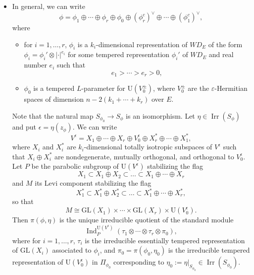 \documentclass[11pt]{amsart}
\numberwithin{equation}{section}
\theoremstyle{plain}
\theoremstyle{definition}
\theoremstyle{remark}
\def\Ind{\operatorname{Ind}}
\def\Irr{\operatorname{Irr}}
\def\GL{\mathrm{GL}}
\def\U{\mathrm{U}}
\def\WD{\mathit{WD}}
\begin{document}
\begin{itemize}
Then the restriction of $R(w, \tau \otimes \pi_0)$ to $\pi(\phi, \eta)$ is the scalar multiplication by 
\begin{equation}
\label{eq:lir}
 \begin{cases}
 \epsilon^k \cdot \eta(a_1) & \text{if $\phi_1$ has sign $(-1)^{n-1}$;} \\
 \epsilon^k & \text{if $\phi_1$ has sign $(-1)^n$.}
 \end{cases}
\end{equation}
These properties follow from the definition of $\eta$, induction in stages \cite[\S 2.7]{kmsw}, and the local intertwining relation \cite[Theorem 3.4.3]{mok}, \cite[Theorem 2.6.2]{kmsw}.
We also remark that the factor $\epsilon^k$ arises from the splitting $s' : W_\psi(M,G) \rightarrow \pi_0(N_\psi(M,G))$ defined in \cite[\S 2.4.1]{kmsw}, which can be explicated by using an analog of Lemma \ref{lem:weyl} below for the dual group.

\item 
In general, we can write
\[
 \phi = \phi_1 \oplus \cdots \oplus \phi_r \oplus \phi_0
 \oplus (\phi_r^c)^\vee \oplus \cdots \oplus (\phi_1^c)^\vee,
\]
where
\begin{itemize}
 \item for $i = 1, \ldots, r$, $\phi_i$ is a $k_i$-dimensional representation of $\WD_E$ of the form $\phi_i = \phi_i' \otimes |\cdot|^{e_i}$ for some tempered representation $\phi_i'$ of $\WD_E$ and real number $e_i$ such that
\[
 e_1 > \cdots > e_r > 0,
\]
 \item $\phi_0$ is a tempered $L$-parameter for $\U(V_0^{\pm})$,
 where $V_0^{\pm}$ are the $\varepsilon$-Hermitian spaces of dimension $n-2(k_1+\cdots+k_r)$ over $E$.
\end{itemize}
Note that the natural map $S_{\phi_0} \rightarrow S_\phi$ is an isomorphism.
Let $\eta \in \Irr(S_{\phi})$ and put $\epsilon = \eta(z_\phi)$.
We can write
\[
 V^\epsilon = X_1 \oplus \cdots \oplus X_r \oplus V_0^\epsilon \oplus X^*_r \oplus \cdots \oplus X^*_1,
\]
where $X_i$ and $X_i^*$ are $k_i$-dimensional totally isotropic subspaces of $V^\epsilon$ such that $X_i \oplus X_i^*$ are nondegenerate, mutually orthogonal,
 and orthogonal to $V_0^\epsilon$.
Let $P$ be the parabolic subgroup of $\U(V^\epsilon)$ stabilizing the flag
\[
 X_1 \subset X_1 \oplus X_2 \subset \dots \subset X_1 \oplus \cdots \oplus X_r
\]
and $M$ its Levi component stabilizing the flag
\[
 X^*_1 \subset X^*_1 \oplus X^*_2 \subset \dots \subset X^*_1 \oplus \cdots \oplus X^*_r,
\]
so that 
\[
 M \cong \GL(X_1) \times \cdots \times \GL(X_r) \times \U(V_0^\epsilon).
\]
Then $\pi(\phi, \eta)$ is the unique irreducible quotient of the standard module
\[
 \Ind^{\U(V^\epsilon)}_P(\tau_1 \otimes \cdots \otimes \tau_r \otimes \pi_0), 
\]
where for $i = 1, \ldots, r$, $\tau_i$ is the irreducible essentially tempered representation of $\GL(X_i)$ associated to $\phi_i$,
and $\pi_0 = \pi(\phi_0, \eta_0)$ is the irreducible tempered representation of $\U(V_0^\epsilon)$ in $\Pi_{\phi_0}$ corresponding to $\eta_0 := \eta|_{S_{\phi_0}} \in \Irr(S_{\phi_0})$.


\end{itemize}
\end{document}
